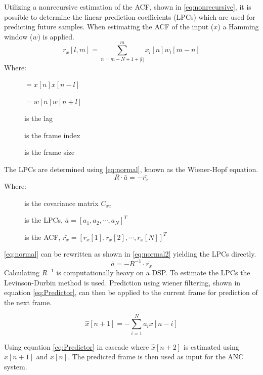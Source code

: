 Utilizing a nonrecursive estimation of the ACF, shown in \autoref{eq:nonrecursive}, it is possible to determine the linear prediction coefficients (LPCs) which are used for predicting future samples. When estimating the ACF of the input ($x$) a Hamming window ($w$) is applied.
\begin{equation}\label{eq:nonrecursive}
r_x[l,m] = \sum^{m}_{n=m-N+1+\left| l\right|} x_l[n]w_l[m-n]
\end{equation}
Where:
\vspace{-8mm}
\begin{description}
	\item[] $=x[n]x[n-l]$ 
	\item[] $=w[n]w[n+l]$
	\item[] is the lag 
	\item[] is the frame index
	\item[] is the frame size
\end{description}
The LPCs are determined using \autoref{eq:normal}, known as the Wiener-Hopf equation.
\begin{equation}\label{eq:normal}
R \cdot \bar{a} = -\bar{r_x}
\end{equation}
Where:
\vspace{-8mm} %
\begin{description}
	\item[] is the covariance matrix $C_{xx}$
	\item[] is the LPCs, $\bar{a} = [a_1 , a_2, \cdots, a_N]^T$
	\item[] is the ACF, $\bar{r_x} = [r_x[1] , r_x[2], \cdots, r_x[N]]^T$
\end{description}
\autoref{eq:normal} can be rewritten as shown in \autoref{eq:normal2} yielding the LPCs directly.  
 \begin{equation}\label{eq:normal2}
\bar{a} = -R^{-1}\cdot \bar{r_x}
\end{equation}
Calculating $R^{-1}$ is computationally heavy on a DSP. To estimate the LPCs the Levinson-Durbin method is used. Prediction using wiener filtering, shown in equation \ref{eq:Predictor}, can then be applied to the current frame for prediction of the next frame. 

\begin{equation}\label{eq:Predictor}
\hat{x}[n+1] =- \sum^{N}_{i=1}a_ix[n-i]
\end{equation}

Using equation \ref{eq:Predictor} in cascade where $\hat{x}[n+2]$ is estimated using $\hat{x}[n+1]$ and $x[n]$. The predicted frame is then used as input for the ANC system.

